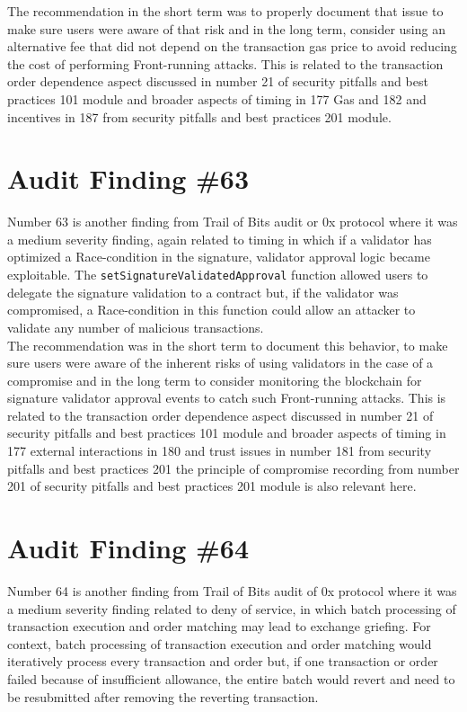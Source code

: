 The recommendation in the short term was to properly document that issue to make sure users were aware of that risk and in the long term, consider using an alternative fee that did not depend on the transaction gas price to avoid reducing the cost of performing Front-running attacks. This is related to the transaction order dependence aspect discussed in number 21 of security pitfalls and best practices 101 module and broader aspects of timing in 177 Gas and 182 and incentives in 187 from security pitfalls and best practices 201 module.

\section{Audit Finding \#63}

Number 63 is another finding from Trail of Bits audit or 0x protocol where it was a medium severity finding, again related to timing in which if a validator has optimized a Race-condition in the signature, validator approval logic became exploitable. The \verb|setSignatureValidatedApproval| function allowed users to delegate the signature validation to a contract but, if the validator was compromised, a Race-condition in this function could allow an attacker to validate any number of malicious transactions.\\

The recommendation was in the short term to document this behavior, to make sure users were aware of the inherent risks of using validators in the case of a compromise and in the long term to consider monitoring the blockchain for signature validator approval events to catch such Front-running attacks. This is related to the transaction order dependence aspect discussed in number 21 of security pitfalls and best practices 101 module and broader aspects of timing in 177 external interactions in 180 and trust issues in number 181 from security pitfalls and best practices 201 the principle of compromise recording from number 201 of security pitfalls and best practices 201 module is also relevant here.

\section{Audit Finding \#64}

Number 64 is another finding from Trail of Bits audit of 0x protocol where it was a medium severity finding related to deny of service, in which batch processing of transaction execution and order matching may lead to exchange griefing. For context, batch processing of transaction execution and order matching would iteratively process every transaction and order but, if one transaction or order failed because of insufficient allowance, the entire batch would revert and need to be resubmitted after removing the reverting transaction.\\

